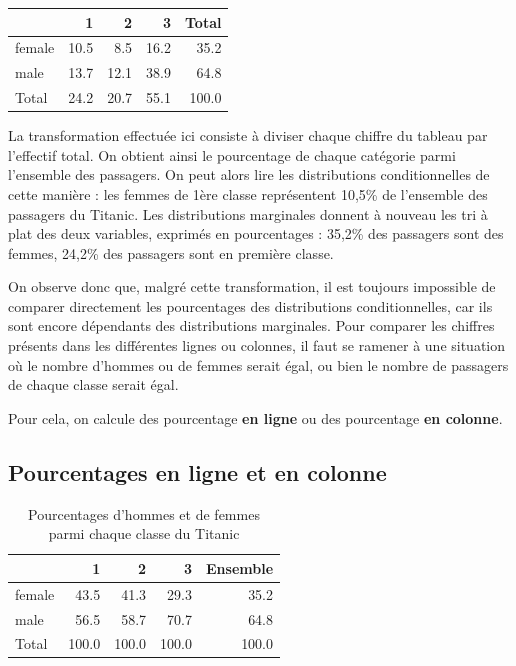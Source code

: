 \documentclass[
]{book}
\begin{document}
\begin{tabular}{l|r|r|r|r}
\hline
  & 1 & 2 & 3 & Total\\
\hline
female & 10.5 & 8.5 & 16.2 & 35.2\\
\hline
male & 13.7 & 12.1 & 38.9 & 64.8\\
\hline
Total & 24.2 & 20.7 & 55.1 & 100.0\\
\hline
\end{tabular}

La transformation effectuée ici consiste à diviser chaque chiffre du tableau par l'effectif total. On obtient ainsi le pourcentage de chaque catégorie parmi l'ensemble des passagers. On peut alors lire les distributions conditionnelles de cette manière : les femmes de 1ère classe représentent 10,5\% de l'ensemble des passagers du Titanic. Les distributions marginales donnent à nouveau les tri à plat des deux variables, exprimés en pourcentages : 35,2\% des passagers sont des femmes, 24,2\% des passagers sont en première classe.

On observe donc que, malgré cette transformation, il est toujours impossible de comparer directement les pourcentages des distributions conditionnelles, car ils sont encore dépendants des distributions marginales. Pour comparer les chiffres présents dans les différentes lignes ou colonnes, il faut se ramener à une situation où le nombre d'hommes ou de femmes serait égal, ou bien le nombre de passagers de chaque classe serait égal.

Pour cela, on calcule des pourcentage \textbf{en ligne} ou des pourcentage \textbf{en colonne}.

\hypertarget{pourcentages-en-ligne-et-en-colonne}{%
\subsection{Pourcentages en ligne et en colonne}\label{pourcentages-en-ligne-et-en-colonne}}

\begin{table}

\caption{\label{tab:unnamed-chunk-18}Pourcentages d'hommes et de femmes parmi chaque classe du Titanic}
\centering
\begin{tabular}[t]{l|r|r|r|r}
\hline
  & 1 & 2 & 3 & Ensemble\\
\hline
female & 43.5 & 41.3 & 29.3 & 35.2\\
\hline
male & 56.5 & 58.7 & 70.7 & 64.8\\
\hline
Total & 100.0 & 100.0 & 100.0 & 100.0\\
\hline
\end{tabular}
\end{table}
\end{document}

